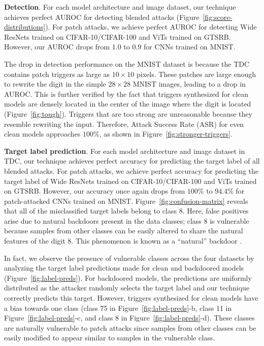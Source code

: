 \documentclass[letterpaper,twocolumn,10pt]{article}
\begin{document}
\textbf{Detection}. For each model architecture and image dataset, our technique achieves perfect AUROC for detecting blended attacks (Figure~\ref{fig:score-distributions}). For patch attacks, we achieve perfect AUROC for detecting Wide ResNets trained on CIFAR-10/CIFAR-100 and ViTs trained on GTSRB. However, our AUROC drops from $1.0$ to $0.9$ for CNNs trained on MNIST.

The drop in detection performance on the MNIST dataset is because the TDC contains patch triggers as large as $10 \times 10$ pixels. These patches are large enough to rewrite the digit in the simple $28 \times 28$ MNIST images, leading to a drop in AUROC. This is further verified by the fact that triggers synthesized for clean models are densely located in the center of the image where the digit is located (Figure~\ref{fig:tough}). Triggers that are too strong are unreasonable because they resemble rewriting the input. Therefore, Attack Success Rate (ASR) for even clean models approaches $100\%$, as shown in Figure~\ref{fig:stronger-triggers}. 

\textbf{Target label prediction}. For each model architecture and image dataset in TDC, our technique achieves perfect accuracy for predicting the target label of all blended attacks. For patch attacks, we achieve perfect accuracy for predicting the target label of Wide ResNets trained on CIFAR-10/CIFAR-100 and ViTs trained on GTSRB. However, our accuracy once again drops from $100\%$ to $94.4\%$ for patch-attacked CNNs trained on MNIST. Figure~\ref{fig:confusion-matrix} reveals that all of the misclassified target labels belong to class 8. Here, false positives arise due to natural backdoors present in the data classes; class 8 is vulnerable because samples from other classes can be easily altered to share the natural features of the digit 8. This phenomenon is known as a ``natural'' backdoor \cite{tao2022natural}.

In fact, we observe the presence of vulnerable classes across the four datasets by analyzing the target label predictions made for clean and backdoored models (Figure~\ref{fig:label-preds}). For backdoored models, the predictions are uniformly distributed as the attacker randomly selects the target label and our technique correctly predicts this target. However, triggers synthesized for clean models have a bias towards one class (class 75 in Figure~\ref{fig:label-preds}-b, class 11 in Figure~\ref{fig:label-preds}-c, and class 8 in Figure~\ref{fig:label-preds}-d). These classes are naturally vulnerable to patch attacks since samples from other classes can be easily modified to appear similar to samples in the vulnerable class.
\end{document}
